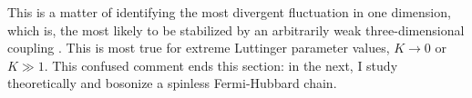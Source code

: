 This is a matter of identifying the most divergent fluctuation in one dimension, which is, the most likely to be stabilized by an arbitrarily weak three-dimensional coupling \cite{giamarchi2003quantum}. This is most true for extreme Luttinger parameter values, $K\to0$ or $K \gg 1$. This confused comment ends this section: in the next, I study theoretically and bosonize a spinless Fermi-Hubbard chain.